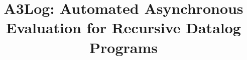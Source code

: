 \documentclass{vldb}
\begin{document}

\title{A3Log: Automated Asynchronous Evaluation for Recursive Datalog Programs}




%
%
%
%

\end{document}

